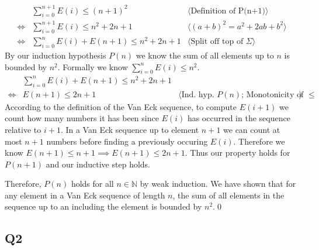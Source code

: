 \documentclass[12pt, fleqn]{article}
\newcommand{\pnote}[1]{{\langle \text{#1} \rangle}}
\begin{document}
\begin{align*}
    &\sum_{i=0}^{n+1}{E(i)} \leq (n+1)^2 & \pnote{Definition of P(n+1)} \\
    \iff& \sum_{i=0}^{n+1}{E(i)} \leq n^2 + 2n + 1 &  \pnote{$(a + b)^2 = a^2 + 2ab + b^2$} \\
    \iff& \sum_{i=0}^{n}{E(i)} + E(n+1) \leq n^2 + 2n + 1 &  \pnote{Split off top of $\Sigma$}
\end{align*}
By our induction hypothesis $P(n)$ we know the sum of all elements up to $n$ is bounded by $n^2$. Formally we know $\sum_{i=0}^{n}{E(i)} \leq n^2$.
\begin{align*}
    & \sum_{i=0}^{n}{E(i)} + E(n+1) \leq n^2 + 2n + 1 &  \\
    \iff& E(n+1) \leq 2n + 1 &  \pnote{Ind. hyp. $P(n)$; Monotonicity of $\leq$}
\end{align*}
According to the definition of the Van Eck sequence, to compute $E(i+1)$ we count how many numbers it has been since $E(i)$ has occurred in the sequence relative to $i+1$. In a Van Eck sequence up to element $n+1$ we can count at most $n+1$ numbers before finding a previously occuring $E(i)$. Therefore we know $E(n+1) \leq n + 1 \implies E(n+1) \leq 2n + 1$. Thus our property holds for $P(n+1)$ and our inductive step holds.

\medskip
Therefore, $P(n)$ holds for all $n \in \mathbb{N}$ by weak induction. We have shown that for any element in a Van Eck sequence of length $n$, the sum of all elements in the sequence up to an including the element is bounded by $n^2$.\qed

\subsection{Q2}
\end{document}
